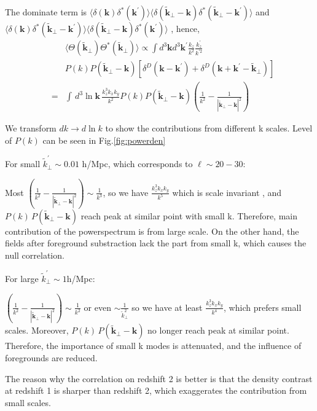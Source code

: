 The dominate term is 
$
    \langle \delta(\bm{k})\delta^\ast(\bm{k^\prime}) \rangle
    \langle \delta(\tilde{\bm{k}}_\perp-\bm{k})
    \delta^\ast(\tilde{\bm{k}}_\perp-\bm{k^\prime})\rangle
$ and 
$
    \langle \delta(\bm{k})
    \delta^\ast(\tilde{\bm{k}}_\perp-\bm{k^\prime})\rangle
    \langle \delta(\tilde{\bm{k}}_\perp-\bm{k})
    \delta^\ast(\bm{k^\prime}) \rangle
$
, hence, 
\begin{eqnarray}
    &&\langle\Theta(\tilde{\bm{k}}_\perp)\Theta^{\ast}(\tilde{\bm{k}}_\perp)\rangle
    \propto\int d^3 \bm{k}d^3 \bm{k^\prime}
    \frac{k_z}{k^2}\frac{k^\prime_z}{k^{\prime2}}
    \\
    &&P(k)P(\tilde{\bm{k}}_\perp-\bm{k})
    [\delta^D(\bm{k}-\bm{k^\prime})+\delta^D(\bm{k}+\bm{k^\prime}-\tilde{\bm{k}}_\perp)]\nonumber\\
    &=&\int\, d^3\ln \bm{k}\, \frac{k_z^3k_xk_y}{k^2}
    P(k)P(\tilde{\bm{k}}_\perp-\bm{k})
    (\frac{1}{k^2}-\frac{1}{|\tilde{\bm{k}}_\perp-\bm{k}|^2})\nonumber
\end{eqnarray}

    We transform $dk\rightarrow d\ln k$ 
    to show the contributions from different k scales.
    Level of $P(k)$ can be seen in Fig.\ref{fig:powerden}

    For small $\tilde{k}_\perp^\prime \sim 0.01$ h/Mpc, 
    which corresponds to $\ell \sim 20-30$:
    
  Most $ (\frac{1}{k^2}-\frac{1}{|\tilde{\bm{k}}_\perp-\bm{k}|^2})
   \sim \frac{1}{k^3}$, 
   so we have $\frac{k_z^3k_xk_y}{k^5}$ which is scale invariant
   , and 
   $ P(k)\,P(\tilde{\bm{k}}_\perp-\bm{k})$
   reach peak at similar point with small k. 
   Therefore, main contribution of the powerspectrum is from large scale.
On the other hand, the fields after foreground substraction lack the part from small k, which causes the null correlation.

For large $\tilde{k}_\perp^\prime\sim 1$h/Mpc:

   $ (\frac{1}{k^2}-\frac{1}{|\tilde{\bm{k}}_\perp-\bm{k}|^2})
   \sim \frac{1}{k^2}$ or even $\sim \frac{1}{\tilde{k}_\perp^2}$
   so we have at least $\frac{k_z^3k_xk_y}{k^4}$, which prefers small scales.
   Moreover, $ P(k)\,P(\tilde{\bm{k}}_\perp-\bm{k})$
   no longer reach peak at similar point. 
Therefore, the importance of small k modes is attenuated, 
and the influence of foregrounds are reduced.

The reason why the correlation on redshift 2 is better is that 
the density contrast at redshift 1 is sharper than redshift 2, 
which exaggerates the contribution from small scales.
